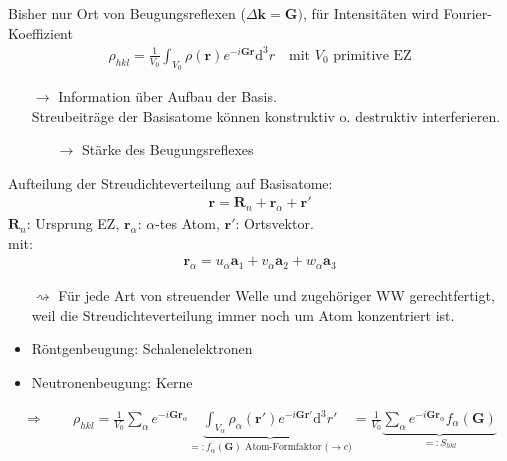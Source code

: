 \begin{itemize}
    Bisher nur Ort von Beugungsreflexen ($\Delta \textbf{k} = \textbf{G})$, für Intensitäten wird Fourier-Koeffizient
    \begin{align*}
        \rho_{hkl} = \frac{1}{V_0} \int_{V_0} \rho (\textbf{r}) e^{-i \textbf{G} \textbf{r}} \mathrm{d}^3r \quad \text{mit } V_0 \text{ primitive EZ}
    \end{align*}
    \begin{itemize}
        \item[$\rightarrow$] Information über Aufbau der Basis.\\
        Streubeiträge der Basisatome können konstruktiv o. destruktiv interferieren.
        \begin{itemize}
            \item[$\rightarrow$] Stärke des Beugungsreflexes
        \end{itemize}
    \end{itemize}
    Aufteilung der Streudichteverteilung auf Basisatome:
    \begin{align*}
        \textbf{r} = \textbf{R}_n + \textbf{r}_\alpha + \textbf{r}'
    \end{align*}
    $\textbf{R}_n$: Ursprung EZ, $\textbf{r}_\alpha$: $\alpha$-tes Atom, $\textbf{r}'$: Ortsvektor.\\
    mit:
    \begin{align*}
        \textbf{r}_\alpha = u_\alpha \textbf{a}_1 + v_\alpha \textbf{a}_2 + w_\alpha \textbf{a}_3
    \end{align*}
    \begin{itemize}
        \item[$\rightsquigarrow$] Für jede Art von streuender Welle und zugehöriger WW gerechtfertigt, weil die Streudichteverteilung immer noch um Atom konzentriert ist.
    \end{itemize}
    \begin{itemize}
        \item Röntgenbeugung: Schalenelektronen
        \item Neutronenbeugung: Kerne
    \end{itemize}
    \begin{align*}
        \Rightarrow \qquad \rho_{hkl} = \frac{1}{V_0} \sum_{\alpha} e^{-i \textbf{G} \textbf{r}_{\alpha}} \underbrace{\int_{V_{\alpha}} \rho_{\alpha} (\textbf{r}') e^{-i \textbf{G} \textbf{r}'} \mathrm{d}^3r'}_{=: f_{\alpha} (\textbf{G})\text{ Atom-Formfaktor ($\rightarrow c$)}}  = \frac{1}{V_0} \underbrace{\sum_{\alpha} e^{-i \textbf{G} \textbf{r}_{\alpha}} f_{\alpha} (\textbf{G})}_{=: S_{hkl}}

\end{align*}
\end{itemize}
